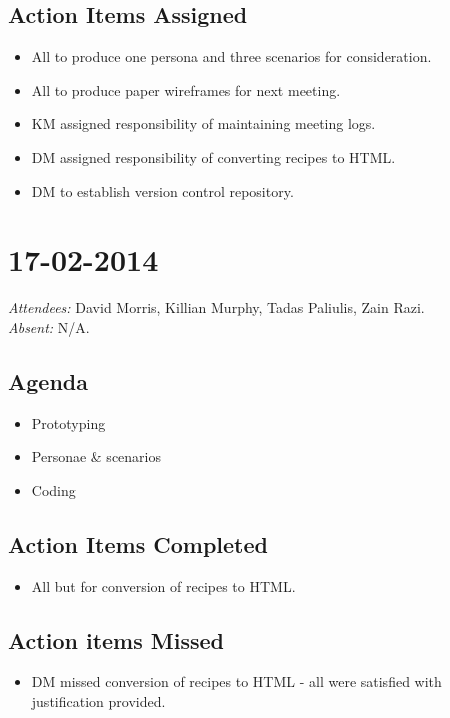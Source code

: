 \documentclass{article}
\begin{document}
\subsection*{Action Items Assigned}
\begin{itemize}
\item All to produce one persona and three scenarios for consideration.
\item All to produce paper wireframes for next meeting.
\item KM assigned responsibility of maintaining meeting logs.
\item DM assigned responsibility of converting recipes to HTML.
\item DM to establish version control repository.
\end{itemize}


\clearpage

\section*{17-02-2014}
\vspace{0.5cm}
\emph{Attendees: }David Morris, Killian Murphy, Tadas Paliulis, Zain Razi.
\\
\emph{Absent: }N/A.

\subsection*{Agenda}
\begin{itemize}
\item Prototyping
\item Personae \& scenarios
\item Coding
\end{itemize}

\subsection*{Action Items Completed}
\begin{itemize}
\item All but for conversion of recipes to HTML.
\end{itemize}

\subsection*{Action items Missed}
\begin{itemize}
\item DM missed conversion of recipes to HTML - all were satisfied with justification provided.
\end{itemize}
\end{document}
